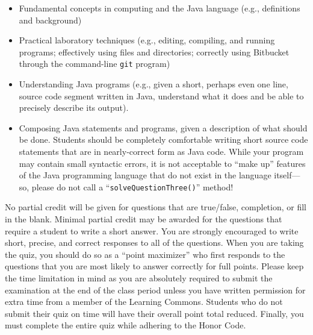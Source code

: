 \vspace*{-.05in}
\begin{itemize}

  \itemsep 0in

\item Fundamental concepts in computing and the Java language (e.g., definitions and background)

\item Practical laboratory techniques (e.g., editing, compiling, and running programs; effectively using files and
  directories; correctly using Bitbucket through the command-line {\tt git} program)

\item Understanding Java programs (e.g., given a short, perhaps even one line, source code segment written in Java,
  understand what it does and be able to precisely describe its output).

\item Composing Java statements and programs, given a description of what should be done. Students should be completely
  comfortable writing short source code statements that are in nearly-correct form as Java code. While your program may
  contain small syntactic errors, it is not acceptable to ``make up'' features of the Java programming language that do
  not exist in the language itself---so, please do not call a ``{\tt solveQuestionThree()}'' method!

\end{itemize}

\noindent No partial credit will be given for questions that are true/false, completion, or fill in the blank. Minimal
partial credit may be awarded for the questions that require a student to write a short answer. You are strongly
encouraged to write short, precise, and correct responses to all of the questions. When you are taking the quiz, you
should do so as a ``point maximizer'' who first responds to the questions that you are most likely to answer correctly
for full points. Please keep the time limitation in mind as you are absolutely required to submit the examination at the
end of the class period unless you have written permission for extra time from a member of the Learning Commons.
Students who do not submit their quiz on time will have their overall point total reduced. Finally, you must complete
the entire quiz while adhering to the Honor Code.


